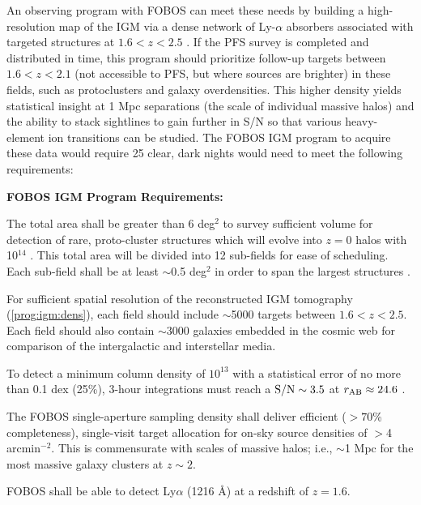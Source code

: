 \documentclass[11pt,a4paper,twoside,onecolumn,openany,final,oldfontcommands]{memoir}
\begin{document}

An observing program with FOBOS can meet these needs by building a high-resolution map of the IGM via a dense network of Ly-$\alpha$ absorbers associated with targeted structures at $1.6 < z < 2.5$ \citep[see][]{lee16}.  If the PFS survey is completed and distributed in time, this program should prioritize follow-up targets between $1.6 < z < 2.1$ (not accessible to PFS, but where sources are brighter) in these fields, such as protoclusters and galaxy overdensities.  This higher density yields statistical insight at 1 Mpc separations (the scale of individual massive halos) and the ability to stack sightlines to gain further in S/N so that various heavy-element ion transitions can be studied.  The FOBOS IGM program to acquire these data would require 25 clear, dark nights would need to meet the following requirements:


\noindent \textbf{FOBOS IGM Program Requirements:}

\begin{programrequirement}
\reqitem The total area shall be greater than 6 deg$^2$ to survey sufficient volume for detection of rare, proto-cluster structures which will evolve into $z=0$ halos with 10$^{14}$ \msun{}.  This total area will be divided into 12 sub-fields for ease of scheduling.  Each sub-field shall be at least $\sim$0.5 deg$^2$ in order to span the largest structures \citep[see][]{lee16}.

\reqitem For sufficient spatial resolution of the reconstructed IGM tomography (\ref{prog:igm:dens}), each field should include $\sim$5000 targets between $1.6 < z < 2.5$. 
\reqitem Each field should also contain $\sim$3000 galaxies embedded in the cosmic web for comparison of the intergalactic and interstellar media.

\reqitem To detect a minimum  column density of $10^{13}$  with a statistical error of no more than 0.1 dex (25\%), 3-hour integrations must reach a ${\rm S/N} \sim 3.5$ at $r_{\rm AB} \approx 24.6$ . 

\end{programrequirement}

\medskip
\begin{sciencerequirement}
\reqitem The FOBOS single-aperture sampling density shall deliver efficient ($>70$\% completeness), single-visit target allocation for on-sky source densities of $>$4 arcmin$^{-2}$.  This is commensurate with scales of massive halos; i.e., $\sim$1 Mpc for the most massive galaxy clusters at $z\sim 2$. \label{prog:igm:dens}


\reqitem FOBOS shall be able to detect Ly$\alpha$ (1216 \AA{}) at a redshift of $z=1.6$.  

\end{sciencerequirement}
\end{document}

